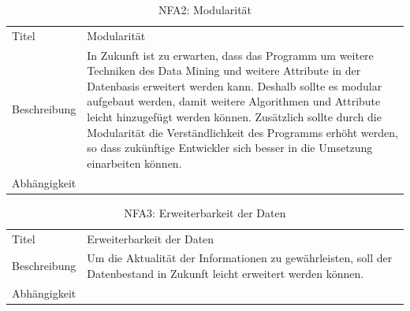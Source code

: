 \begin{table}[H] 
	\caption{NFA2: Modularität}
	\centering
	\label{fig:anforderungsanalyse:nichtfunktionaleanforderung:nfa2}
	\begin{tabular}{ | l | L{10cm} | } 
		\hline 
		 \\ \hline 
		Titel & Modularität \\ \hline 
		Beschreibung & In Zukunft ist zu erwarten, dass das Programm um weitere Techniken des Data Mining und weitere Attribute in der Datenbasis erweitert werden kann. Deshalb sollte es modular aufgebaut werden, damit weitere Algorithmen und Attribute leicht hinzugefügt werden können. Zusätzlich sollte durch die Modularität die Verständlichkeit des Programms erhöht werden, so dass zukünftige Entwickler sich besser in die Umsetzung einarbeiten können. \\ \hline 
		Abhängigkeit & \\ \hline 
	\end{tabular}
\end{table}

\begin{table}[H] 
	\caption{NFA3: Erweiterbarkeit der Daten}
	\centering
	\label{fig:anforderungsanalyse:nichtfunktionaleanforderung:nfa3}
	\begin{tabular}{ | l | L{10cm} | } 
		\hline 
		 \\ \hline 
		Titel & Erweiterbarkeit der Daten \\ \hline 
		Beschreibung & Um die Aktualität der Informationen zu gewährleisten, soll der Datenbestand in Zukunft leicht erweitert werden können. \\ \hline 
		Abhängigkeit & \\ \hline 
	\end{tabular}
\end{table}
 
